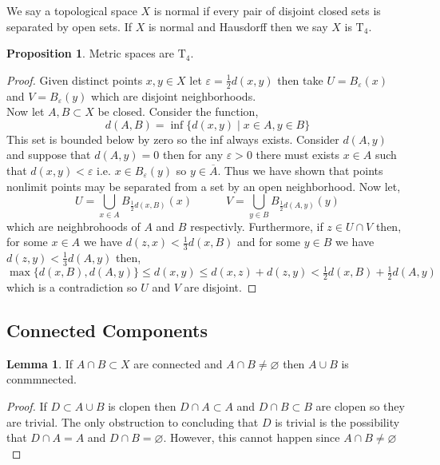 \documentclass[12pt]{extarticle}
\theoremstyle{definition}
\newtheorem{lemma}[theorem]{Lemma}
\newtheorem{proposition}[theorem]{Proposition}
\newenvironment{definition}[1][Definition:]{\begin{trivlist}
\item[\hskip \labelsep {\bfseries #1}]}{\end{trivlist}}
\begin{document}
\begin{definition}
We say a topological space $X$ is normal if every pair of disjoint closed sets is separated by open sets. If $X$ is normal and Hausdorff then we say $X$ is $\mathrm{T}_4$. 
\end{definition}

\begin{proposition}
Metric spaces are $\mathrm{T}_4$. 
\end{proposition}

\begin{proof}
Given distinct points $x,y \in X$ let $\varepsilon = \tfrac{1}{2} d(x, y)$ then take $U = B_{\varepsilon}(x)$ and $V = B_{\varepsilon}(y)$ which are disjoint neighborhoods. 
\bigskip\\
Now let $A, B \subset X$ be closed. Consider the function,
\[ d(A, B) = \inf \{d(x,y) \mid x \in A , y \in B \} \]
This set is bounded below by zero so the inf always exists. Consider $d(A, y)$ and suppose that $d(A, y) = 0$ then for any $\varepsilon > 0$ there must exists $x \in A$ such that $d(x, y) < \varepsilon$ i.e. $x \in B_{\varepsilon}(y)$ so $y \in \overline{A}$. Thus we have shown that points nonlimit points may be separated from a set by an open neighborhood. Now let,
\[ U = \bigcup_{x \in A} B_{\tfrac{1}{2} d(x, B)}(x) \quad \quad \quad V = \bigcup_{y \in B} B_{\tfrac{1}{2} d(A, y)}(y) \] 
which are neighbrohoods of $A$ and $B$ respectivly. Furthermore, if $z \in U \cap V$ then, for some $x \in A$ we have $d(z, x) < \tfrac{1}{3} d(x, B)$ and for some $y \in B$ we have $d(z, y) < \tfrac{1}{3} d(A, y)$ then,
\[ \max \{ d(x, B), d(A, y) \} \le d(x, y) \le d(x, z) + d(z, y) < \tfrac{1}{2} d(x, B) + \tfrac{1}{2} d(A, y) \]
which is a contradiction so $U$ and $V$ are disjoint.
\end{proof}

\subsection{Connected Components}

\begin{lemma}
If $A \cap B \subset X$ are connected and $A \cap B \neq \varnothing$ then $A \cup B$ is conmmnected.
\end{lemma}

\begin{proof}
If $D \subset A \cup B$ is clopen then $D \cap A \subset A$ and $D \cap B \subset B$ are clopen so they are trivial. The only obstruction to concluding that $D$ is trivial is the possibility that $D \cap A = A$ and $D \cap B = \varnothing$. However, this cannot happen since $A \cap B \neq \varnothing$ 
\end{proof}
\end{document}
